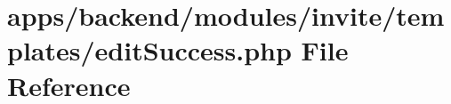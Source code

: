 \hypertarget{backend_2modules_2invite_2templates_2edit_success_8php}{\section{apps/backend/modules/invite/templates/edit\-Success.php File Reference}
\label{backend_2modules_2invite_2templates_2edit_success_8php}
}
